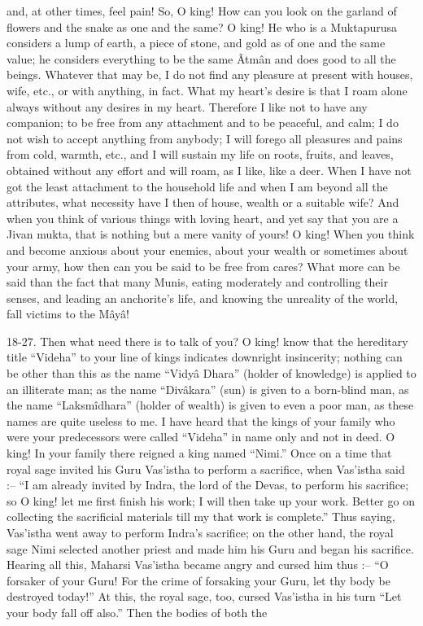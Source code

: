 and, at other times, feel pain! So, O king! How can you look on the garland of flowers and the snake as one and the same? O king! He who is a Muktapurusa considers a lump of earth, a piece of stone, and gold as of one and the same value; he considers everything to be the same Âtmân and does good to all the beings. Whatever that may be, I do not find any pleasure at present with houses, wife, etc., or with anything, in fact. What my heart’s desire is that I roam alone always without any desires in my heart. Therefore I like not to have any companion; to be free from any attachment and to be peaceful, and calm; I do not wish to accept anything from anybody; I will forego all pleasures and pains from cold, warmth, etc., and I will sustain my life on roots, fruits, and leaves, obtained without any effort and will roam, as I like, like a deer. When I have not got the least attachment to the household life and when I am beyond all the attributes, what necessity have I then of house, wealth or a suitable wife? And when you think of various things with loving heart, and yet say that you are a Jivan mukta, that is nothing but a mere vanity of yours! O king! When you think and become anxious about your enemies, about your wealth or sometimes about your army, how then can you be said to be free from cares? What more can be said than the fact that many Munis, eating moderately and controlling their senses, and leading an anchorite's life, and knowing the unreality of the world, fall victims to the Mâyâ!

 

18-27. Then what need there is to talk of you? O king! know that the hereditary title “Videha” to your line of kings indicates downright insincerity; nothing can be other than this as the name “Vidyâ Dhara” (holder of knowledge) is applied to an illiterate man; as the name “Divâkara” (sun) is given to a born-blind man, as the name “Laksmîdhara” (holder of wealth) is given to even a poor man, as these names are quite useless to me. I have heard that the kings of your family who were your predecessors were called “Videha” in name only and not in deed. O king! In your family there reigned a king named “Nimi.” Once on a time that royal sage invited his Guru Vas’istha to perform a sacrifice, when Vas'istha said :-- “I am already invited by Indra, the lord of the Devas, to perform his sacrifice; so O king! let me first finish his work; I will then take up your work. Better go on collecting the sacrificial materials till my that work is complete.” Thus saying, Vas'istha went away to perform Indra's sacrifice; on the other hand, the royal sage Nimi selected another priest and made him his Guru and began his sacrifice. Hearing all this, Maharsi Vas’istha became angry and cursed him thus :-- “O forsaker of your Guru! For the crime of forsaking your Guru, let thy body be destroyed today!” At this, the royal sage, too, cursed Vas'istha in his turn “Let your body fall off also.” Then the bodies of both the

